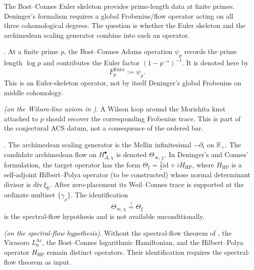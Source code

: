 The Bost--Connes Euler skeleton provides prime-length data at finite
primes. Deninger's formalism requires a global Frobenius/flow operator
acting on all three cohomological degrees. The question is whether the
Euler skeleton and the archimedean scaling generator combine into such
an operator.

\begin{definition}
\label{v4-arith:w8-a:def:F-finite}
\ClaimStatusDefinitional. At a finite prime \(p\), the Bost--Connes
Adams operation \(\psi_p\) records the prime length \(\log p\) and
contributes the Euler factor \((1-p^{-s})^{-1}\). It is denoted here by
\[
F^{\mathrm{Euler}}_p:=\psi_p.
\]
This is an Euler-skeleton operator, not by itself Deninger's global
Frobenius on middle cohomology.
\end{definition}

\begin{proposition}
\label{v4-arith:w8-a:lem:wilson-finite}
\ClaimStatusConditional \emph{(on the Wilson-line axiom in
)}. A Wilson loop around the
Morishita knot attached to \(p\) should recover the corresponding
Frobenius trace. This is part of the conjectural ACS datum, not a
consequence of the ordered bar.
\end{proposition}

\begin{definition}
\label{v4-arith:w8-a:def:F-infinity}
\ClaimStatusDefinitional. The archimedean scaling generator is the
Mellin infinitesimal \(-\partial_t\) on \(\mathbb{R}_+\). The
candidate archimedean flow on \(H^\bullet_{\Delta,\chi}\) is denoted
\(\Theta_{\infty,\chi}\). In Deninger's and Connes' formulation, the
target operator has the form
\(\Theta_\xi = \tfrac{1}{2}\mathrm{id} + iH_{\mathrm{HP}}\),
where \(H_{\mathrm{HP}}\) is a self-adjoint Hilbert--Polya operator
(to be constructed) whose normal determinant divisor is
\(\mathrm{div}\,\xi_{\mathbb R}\). After zero-placement its
Weil--Connes trace is supported at the ordinate multiset
\(\{\gamma_\rho\}\). The identification
\begin{equation}
\label{v4-arith:w8-a:eq:F-infinity}
\Theta_{\infty,\chi}\stackrel{?}{=}
\Theta_\xi
\end{equation}
is the spectral-flow hypothesis and is not available unconditionally.
\end{definition}

\begin{proposition}
\label{v4-arith:w8-a:lem:L0-conjugacy}
\ClaimStatusConditional \emph{(on the spectral-flow hypothesis)}.
Without the spectral-flow theorem of
, the Virasoro
\(L_0^{\mathrm{Ar}}\), the Bost--Connes logarithmic Hamiltonian, and
the Hilbert--Polya operator \(H_{\mathrm{HP}}\) remain distinct
operators. Their identification requires the spectral-flow theorem as
input.
\end{proposition}

